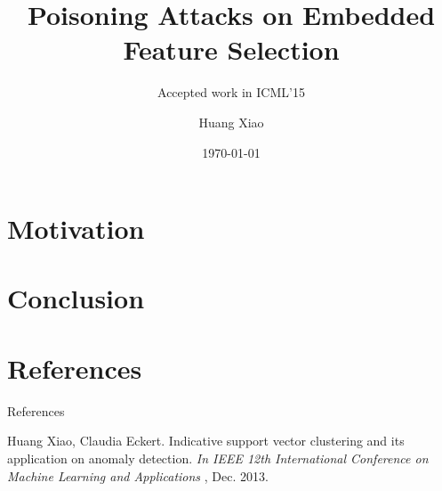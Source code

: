 \documentclass[10pt]{beamer}
\begin{document}
\title{Poisoning Attacks on Embedded Feature Selection}
\subtitle{Accepted work in ICML'15}
\author{Huang Xiao} %

\date{\today}
\maketitle



\section{Motivation}

\section{Conclusion}

\section{References}
\begin{frame}{References}
\begin{thebibliography}{99}
Huang Xiao, Claudia Eckert. Indicative support vector clustering and its application on anomaly detection.  \textit{In IEEE 12th International Conference on Machine Learning and Applications }, Dec. 2013.
\end{thebibliography}
\end{frame}
\end{document}
